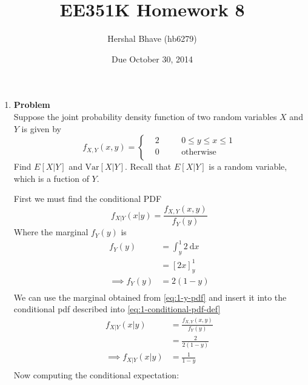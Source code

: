 \documentclass[12pt]{article}
\title{EE351K Homework 8}
\author{Hershal Bhave (hb6279)}
\date{Due October 30, 2014}
\newenvironment{Ex}{\textbf{Problem}\vspace{.75em}\\}{}
\newcommand{\dd}[1]{\:\mathrm{d}{#1}}
\begin{document}
\maketitle
\begin{enumerate}
\item
  \begin{Ex}
    Suppose the joint probability density function of two random
    variables $X$ and $Y$ is given by
    \begin{equation}
      \label{eq:1-question}
      f_{X,Y}(x,y) = \left\{
        \begin{aligned}
          & 2 &&\quad 0\le y \le x \le 1 \\
          & 0 &&\quad \text{otherwise} \\
        \end{aligned} \right.
    \end{equation}
    Find $E[X|Y]$ and $\text{Var}[X|Y]$. Recall that $E[X|Y]$ is a
    random variable, which is a fuction of $Y$.
    \begin{solution}
      First we must find the conditional PDF
      \begin{equation}
        \label{eq:1-conditional-pdf-def}
          f_{X|Y}(x|y) = \frac{f_{X,Y}(x,y)}{f_Y(y)}
      \end{equation}
      Where the marginal $f_Y(y)$ is
      \begin{equation}
        \label{eq:1-y-pdf}
        \begin{aligned}
          f_Y(y) &= \int_y^1 2\dd{x} \\
          &= [2x]_y^1 \\
          \implies f_Y(y) &= 2(1-y) \\
        \end{aligned}
      \end{equation}
      We can use the marginal obtained from \cref{eq:1-y-pdf} and insert
      it into the conditional pdf described into
      \cref{eq:1-conditional-pdf-def}
      \begin{equation}
        \label{eq:1-pdf-plugged}
        \begin{aligned}
          f_{X|Y}(x|y) &= \frac{f_{X,Y}(x,y)}{f_Y(y)} \\
          &= \frac{2}{2(1-y)} \\
          \implies f_{X|Y}(x|y) &= \frac{1}{1-y} \\
        \end{aligned}
      \end{equation}
      Now computing the conditional expectation:

\end{solution}
\end{Ex}
\end{enumerate}
\end{document}
